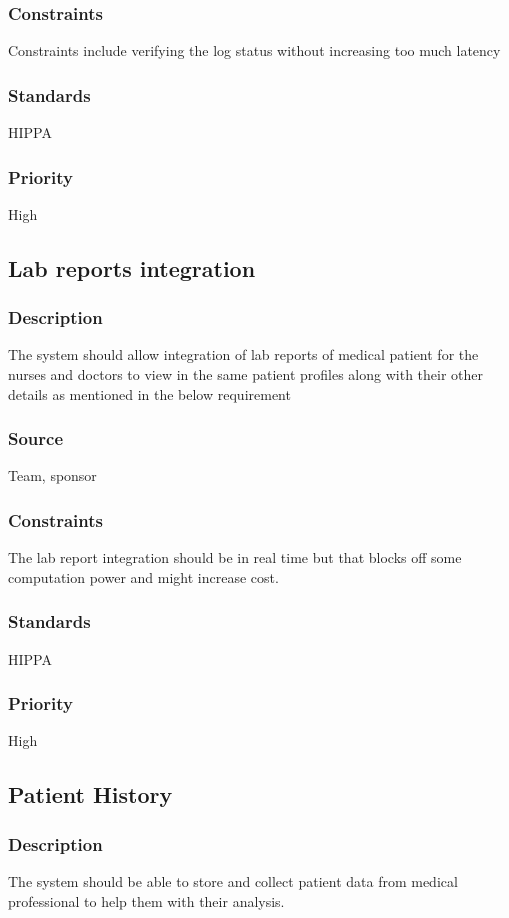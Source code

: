 \subsubsection{Constraints}
Constraints include verifying the log status without increasing too much latency
\subsubsection{Standards}
HIPPA
\subsubsection{Priority}
High 

\subsection{Lab reports integration}
\subsubsection{Description}
The system should allow integration of lab reports of medical patient for the nurses and doctors to view in the same patient profiles along with their other details as mentioned in the below requirement
\subsubsection{Source}
Team, sponsor
\subsubsection{Constraints}
The lab report integration should be in real time but that blocks off some computation power and might increase cost.
\subsubsection{Standards}
HIPPA
\subsubsection{Priority}
High 


\subsection{Patient History }
\subsubsection{Description}
The system should be able to store and collect patient data from medical professional to help them with their analysis.
